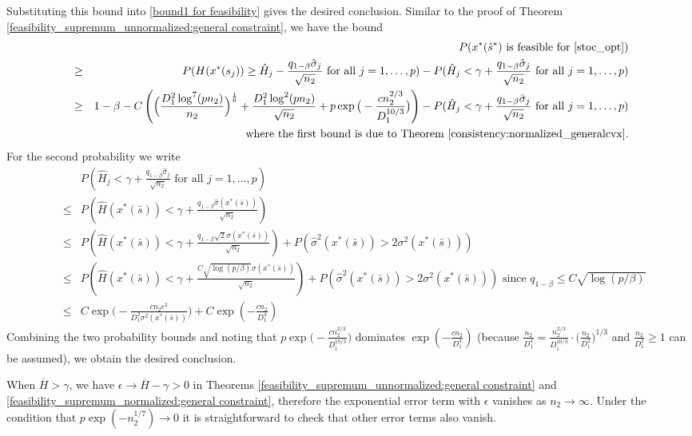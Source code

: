 \documentclass[mnsc,blindrev]{informs4} %
\newcommand{\prth}[1]{\left(#1\right)}
\begin{document}
Substituting this bound into \eqref{bound1 for feasibility} gives the desired conclusion.\hfill\Halmos
{}Similar to the proof of Theorem \ref{feasibility_supremum_unnormalized:general constraint}, we have the bound
\begin{eqnarray*}
&&P(x^*(\hat s^*)\text{ is feasible for \eqref{stoc_opt}})\\
&\geq&P(H(x^*(s_j))\geq\hat H_j-  \frac{ q_{1-\beta}\hat\sigma_j}{\sqrt{n_2}}\text{ for all } j=1,\ldots,p)-P(\hat H_j< \gamma + \frac{ q_{1-\beta}\hat\sigma_j}{\sqrt{n_2}}\text{ for all }j=1,\ldots,p)\\
&\geq&1-\beta-C\prth{\Big(\frac{D_1^2\log^7(pn_2)}{n_2}\Big)^{\frac{1}{6}}+\frac{D_1^2\log^2(pn_2)}{\sqrt{n_2}}+p\exp\big(-\frac{cn_2^{2/3}}{D_1^{10/3}}\big)}-P(\hat H_j< \gamma + \frac{ q_{1-\beta}\hat\sigma_j}{\sqrt{n_2}}\text{ for all }j=1,\ldots,p)\\
&&\text{\ \ where the first bound is due to Theorem \ref{consistency:normalized_generalcvx}}.
\end{eqnarray*}
For the second probability we write
\begin{eqnarray*}
&&P(\hat H_j< \gamma + \frac{ q_{1-\beta}\hat\sigma_j}{\sqrt{n_2}}\text{ for all }j=1,\ldots,p)\\
&\leq&P(\hat H(x^*(\bar{s}))< \gamma + \frac{ q_{1-\beta}\hat\sigma(x^*(\bar{s}))}{\sqrt{n_2}})\\
&\leq &P(\hat H(x^*(\bar{s}))< \gamma + \frac{ q_{1-\beta}\sqrt{2}\sigma(x^*(\bar{s}))}{\sqrt{n_2}})+P(\hat\sigma^2(x^*(\bar{s}))>2\sigma^2(x^*(\bar{s})))\\
&\leq &P(\hat H(x^*(\bar{s}))< \gamma + \frac{C\sqrt{\log(p/\beta)}\sigma(x^*(\bar{s}))}{\sqrt{n_2}})+P(\hat\sigma^2(x^*(\bar{s}))>2\sigma^2(x^*(\bar{s})))\text{\ \ since }q_{1-\beta}\leq C\sqrt{\log(p/\beta)}\\
&\leq&C\exp\big(-\frac{cn_2\epsilon^2}{D_1^2\sigma^2(x^*(\bar{s}))}\big)+C\exp(-\frac{cn_2}{D_1^4})
\end{eqnarray*}
Combining the two probability bounds and noting that $p\exp\big(-\frac{cn_2^{2/3}}{D_1^{10/3}}\big)$ dominates $\exp(-\frac{cn_2}{D_1^4})$ (because $\frac{n_2}{D_1^4}=\frac{n_2^{2/3}}{D_1^{10/3}}\cdot \big(\frac{n_2}{D_1^2}\big)^{1/3}$ and $\frac{n_2}{D_1^2}\geq 1$ can be assumed), we obtain the desired conclusion. \hfill\Halmos

When $\overline{H}>\gamma$, we have $\epsilon\to \overline{H}-\gamma>0$ in Theorems \ref{feasibility_supremum_unnormalized:general constraint} and \ref{feasibility_supremum_normalized:general constraint}, therefore the exponential error term with $\epsilon$ vanishes as $n_2\to\infty$. Under the condition that $p\exp(-n_2^{1/7})\to 0$ it is straightforward to check that other error terms also vanish.\hfill\Halmos
\end{document}
